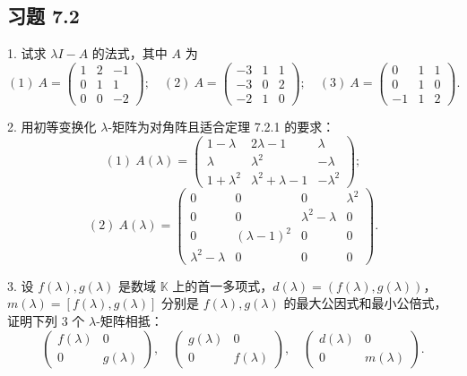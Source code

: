 \documentclass[UTF8,12pt,a4paper,fontset=fandol]{ctexart}
\begin{document}
\subsection*{习题 7.2}

1. 试求 $\lambda I-A$ 的法式，其中 $A$ 为
\[
(1)\ A=\left(\begin{array}{ccc}
1 & 2 & -1\\
0 & 1 & 1\\
0 & 0 & -2
\end{array}\right);\quad
(2)\ A=\left(\begin{array}{ccc}
-3 & 1 & 1\\
-3 & 0 & 2\\
-2 & 1 & 0
\end{array}\right);\quad
(3)\ A=\left(\begin{array}{ccc}
0 & 1 & 1\\
0 & 1 & 0\\
-1 & 1 & 2
\end{array}\right).
\]

2. 用初等变换化 $\lambda$-矩阵为对角阵且适合定理 7.2.1 的要求：
\[
(1)\ A(\lambda)=\left(\begin{array}{ccc}
1-\lambda & 2\lambda-1 & \lambda\\
\lambda & \lambda^2 & -\lambda\\
1+\lambda^2 & \lambda^2+\lambda-1 & -\lambda^2
\end{array}\right);
\]
\[
(2)\ A(\lambda)=\left(\begin{array}{cccc}
0 & 0 & 0 & \lambda^2\\
0 & 0 & \lambda^2-\lambda & 0\\
0 & (\lambda-1)^2 & 0 & 0\\
\lambda^2-\lambda & 0 & 0 & 0
\end{array}\right).
\]

3. 设 $f(\lambda),g(\lambda)$ 是数域 $\mathbb{K}$ 上的首一多项式，$d(\lambda)=(f(\lambda),g(\lambda))$，$m(\lambda)=[f(\lambda),g(\lambda)]$ 分别是 $f(\lambda),g(\lambda)$ 的最大公因式和最小公倍式，证明下列 3 个 $\lambda$-矩阵相抵：
\[
\left(\begin{array}{cc}
f(\lambda) & 0\\
0 & g(\lambda)
\end{array}\right),\quad
\left(\begin{array}{cc}
g(\lambda) & 0\\
0 & f(\lambda)
\end{array}\right),\quad
\left(\begin{array}{cc}
d(\lambda) & 0\\
0 & m(\lambda)
\end{array}\right).
\]
\end{document}
